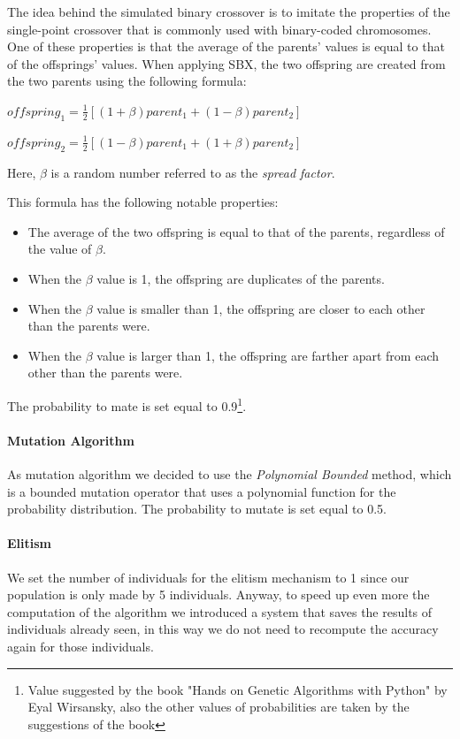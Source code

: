 The idea behind the simulated binary crossover is to imitate the properties of the single-point crossover that is commonly used with binary-coded chromosomes. One of these properties is that the average of the parents' values is equal to that of the offsprings' values.
When applying SBX, the two offspring are created from the two parents using the following formula:

$
	offspring_1 = \frac{1}{2}[(1+\beta)parent_1 + (1-\beta)parent_2] 
$
\medskip

$
	offspring_2 = \frac{1}{2}[(1-\beta)parent_1 + (1+\beta)parent_2]
$


\noindent Here, $\beta$ is a random number referred to as the \textit{spread factor}.

\noindent This formula has the following notable properties:
\begin{itemize}
\item The average of the two offspring is equal to that of the parents, regardless of the value of $\beta$.
\item When the $\beta$ value is 1, the offspring are duplicates of the parents.
\item When the $\beta$ value is smaller than 1, the offspring are closer to each other than the parents were.
\item When the $\beta$ value is larger than 1, the offspring are farther apart from each other than the parents were.
\end{itemize}

\noindent The probability to mate is set equal to 0.9\footnote{Value suggested by the book "Hands on Genetic Algorithms with Python" by Eyal Wirsansky, also the other values of probabilities are taken by the suggestions of the book}.

\paragraph{Mutation Algorithm}
As mutation algorithm we decided to use the \textit{Polynomial Bounded} method, which is a bounded mutation operator that uses a polynomial function for the probability distribution.
\noindent The probability to mutate is set equal to 0.5.

\paragraph{Elitism}
We set the number of individuals for the elitism mechanism to 1 since our population is only made by 5 individuals. Anyway, to speed up even more the computation of the algorithm we introduced a system that saves the results of individuals already seen, in this way we do not need to recompute the accuracy again for those individuals.

